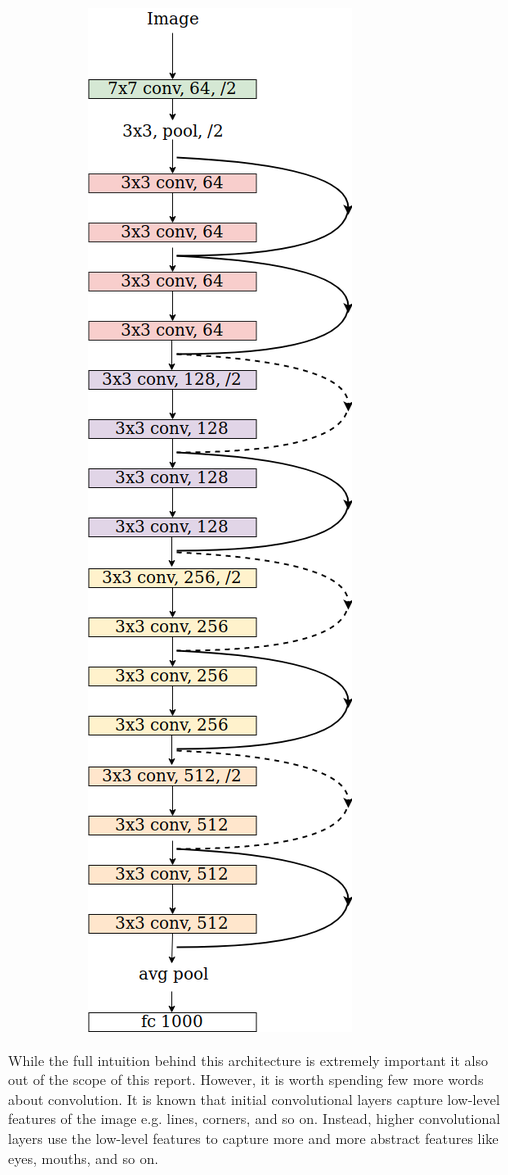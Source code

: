 \begin{figure}
\begin{subfigure}{.5\textwidth}
        \includegraphics[width=.35\linewidth]{figs/resnet.png}
        \label{fig:resnet}
    \end{subfigure}
\end{figure}


While the full intuition behind this architecture is extremely important it also out of the scope of this report. However, it is worth spending few more words about convolution. It is known that initial convolutional layers capture low-level features of the image e.g. lines, corners, and so on. Instead, higher convolutional layers use the low-level features to capture more and more abstract features like eyes, mouths, and so on.


